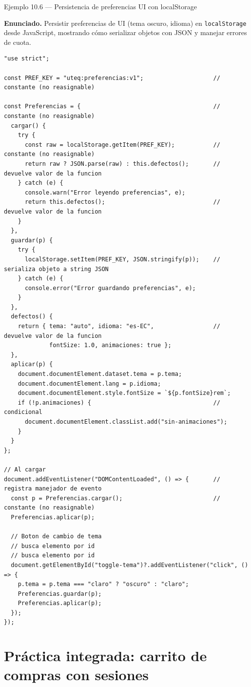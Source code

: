 \documentclass[11pt,a4paper,openany]{book}
\begin{document}
\begin{cajaejemplo}{Ejemplo 10.6 --- Persistencia de preferencias UI con localStorage}

\textbf{Enunciado.} Persistir preferencias de UI (tema oscuro, idioma) en \texttt{localStorage} desde JavaScript, mostrando cómo serializar objetos con JSON y manejar errores de cuota.

\begin{lstlisting}[style=js,caption={preferencias.js},label=lst:10.14]
"use strict";

const PREF_KEY = "uteq:preferencias:v1";                    // constante (no reasignable)

const Preferencias = {                                      // constante (no reasignable)
  cargar() {
    try {
      const raw = localStorage.getItem(PREF_KEY);           // constante (no reasignable)
      return raw ? JSON.parse(raw) : this.defectos();       // devuelve valor de la funcion
    } catch (e) {
      console.warn("Error leyendo preferencias", e);
      return this.defectos();                               // devuelve valor de la funcion
    }
  },
  guardar(p) {
    try {
      localStorage.setItem(PREF_KEY, JSON.stringify(p));    // serializa objeto a string JSON
    } catch (e) {
      console.error("Error guardando preferencias", e);
    }
  },
  defectos() {
    return { tema: "auto", idioma: "es-EC",                 // devuelve valor de la funcion
             fontSize: 1.0, animaciones: true };
  },
  aplicar(p) {
    document.documentElement.dataset.tema = p.tema;
    document.documentElement.lang = p.idioma;
    document.documentElement.style.fontSize = `${p.fontSize}rem`;
    if (!p.animaciones) {                                   // condicional
      document.documentElement.classList.add("sin-animaciones");
    }
  }
};

// Al cargar
document.addEventListener("DOMContentLoaded", () => {       // registra manejador de evento
  const p = Preferencias.cargar();                          // constante (no reasignable)
  Preferencias.aplicar(p);

  // Boton de cambio de tema
  // busca elemento por id
  // busca elemento por id
  document.getElementById("toggle-tema")?.addEventListener("click", () => {
    p.tema = p.tema === "claro" ? "oscuro" : "claro";
    Preferencias.guardar(p);
    Preferencias.aplicar(p);
  });
});
\end{lstlisting}
\end{cajaejemplo}

\section{Práctica integrada: carrito de compras con sesiones}
\end{document}
